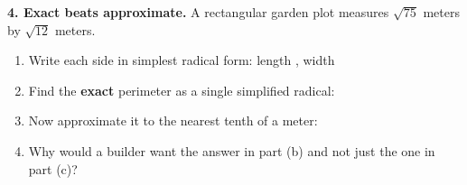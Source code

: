 \documentclass[10pt]{article}
\begin{document}
\begin{tcolorbox}[colback=white, colframe=black!40, title=\textbf{Tier A --- Approaching Proficiency},
    fonttitle=\bfseries, arc=1.5mm, left=3mm, right=3mm, top=2mm, bottom=2mm, breakable]
\vspace{3pt}
\textbf{4. Exact beats approximate.} A rectangular garden plot measures $\sqrt{75}$ meters by
$\sqrt{12}$ meters.
\begin{enumerate}[label=(\alph*), leftmargin=1.9em, itemsep=4pt]
  \item Write each side in simplest radical form: \; length \blank{2.0cm}, \; width \blank{2.0cm}
  \item Find the \textbf{exact} perimeter as a single simplified radical: \blank{2.6cm}
  \item Now approximate it to the nearest tenth of a meter: \blank{2.4cm}
  \item Why would a builder want the answer in part (b) and not just the one in part (c)?
        \writeline
\end{enumerate}
\end{tcolorbox}
\end{document}
